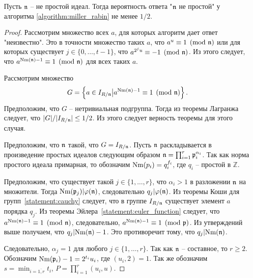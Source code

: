 \documentclass[_00_dissertation.tex]{subfiles}
\begin{document}
\begin{proposition}
    Пусть $\mathfrak{n}$ -- не простой идеал.
    Тогда вероятность ответа "$\mathfrak{n}$ не простой" у алгоритма \ref{algorithm:miller_rabin} не менее $1/2$.
\end{proposition}
\begin{proof}
    Рассмотрим множество всех $a$, для которых алгоритм дает ответ "неизвестно".
    Это в точности множество таких $a$, что $a^u \equiv 1 \pmod{\mathfrak{n}}$ или для которых существует $j \in \{0, \dots, t-1\}$, что $a^{2^{j}u} \equiv -1 \pmod{\mathfrak{n}}$.
    Из этого следует, что $a^{\textrm{Nm}(\mathfrak{n}) - 1} \equiv 1 \pmod{\mathfrak{n}}$ для всех таких $a$.

    Рассмотрим множество
    \begin{equation*}
        G = \left\{
            a \in I_{R/\mathfrak{n}} \big| a^{\textrm{Nm}(\mathfrak{n}) - 1} \equiv 1 \pmod{\mathfrak{n}}
        \right\}.
    \end{equation*}
    Предположим, что $G$ -- нетривиальная подгруппа.
    Тогда из теоремы Лагранжа следует, что $|G| / |I_{R/\mathfrak{n}}| \le 1/2$.
    Из этого следует верность теоремы для этого случая.

    Предположим, что $\mathfrak{n}$ такой, что $G = I_{R/\mathfrak{n}}$.
    Пусть $\mathfrak{n}$ раскладывается в произведение простых идеалов следующим образом $\mathfrak{n} = \prod_{i=1}^r \mathfrak{p}_i^{\alpha_i}$.
    Так как норма простого идеала примарная, то обозначим $\textrm{Nm}(p_i) = q_i^{f_i}$, где $q_i$ -- простой в $\mathbb{Z}$.

    Предположим, что существует такой $j \in \{1, \dots, r\}$, что $\alpha_i > 1$ в разложении $\mathfrak{n}$ на множители.
    Тогда $\textrm{Nm}(\mathfrak{p}_j) | \varphi(\mathfrak{n})$, следовательно $q_j | \varphi(\mathfrak{n})$.
    Из теоремы Коши для групп~\ref{statement:cauchy} следует, что в группе $I_{R/\mathfrak{n}}$ существует элемент $a$ порядка $q_j$.
    Из теоремы Эйлера~\ref{statement:euler_function} следует, что $a^{\textrm{Nm}(\mathfrak{n}) - 1} \equiv 1 \pmod{\mathfrak{n}}$, следовательно, $a^{\textrm{Nm}(\mathfrak{n}) - 1} \equiv 1 \pmod{\mathfrak{p}}$.
    Из утверждений выше получаем, что $q_j | \textrm{Nm}(\mathfrak{n}) - 1$.
    Это противоречит тому, что $q_j | \textrm{Nm}(\mathfrak{n})$.

    Следовательно, $\alpha_j = 1$ для любого $j \in \{1, \dots, r\}$.
    Так как $\mathfrak{n}$ -- составное, то $r \ge 2$.
    Обозначим $\textrm{Nm}(\mathfrak{p}_i) - 1 = 2^{t_i} u_i$, где $(u_i, 2) = 1$.
    Так же обозначим $s = \min_{i=\overline{1, r}} t_i$, $P = \prod_{i=1}^r (u_i, u)$.


\end{proof}
\end{document}

